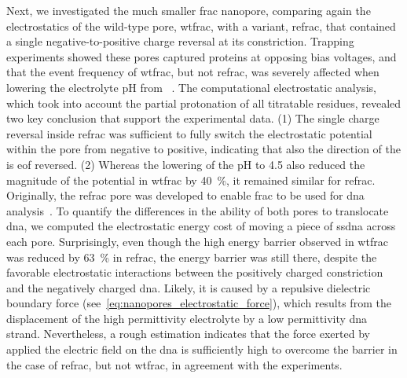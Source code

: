 Next, we investigated the much smaller \gls{frac} nanopore, comparing again the electrostatics of the
wild-type pore, \gls{wtfrac}, with a variant, \gls{refrac}, that contained a single negative-to-positive
charge reversal at its constriction. Trapping experiments showed these pores captured proteins at opposing
bias voltages, and that the event frequency of \gls{wtfrac}, but not \gls{refrac}, was severely affected when
lowering the electrolyte pH from ~\cite{Huang-2017}. The computational electrostatic
analysis, which took into account the partial protonation of all titratable residues, revealed two key
conclusion that support the experimental data. (1) The single charge reversal inside \gls{refrac} was
sufficient to fully switch the electrostatic potential within the pore \lumen{} from negative to positive,
indicating that also the direction of the is \gls{eof} reversed. (2) Whereas the lowering of the pH to 4.5
also reduced the magnitude of the potential in \gls{wtfrac} by \SI{40}{\percent}, it remained similar for
\gls{refrac}. Originally, the \gls{refrac} pore was developed to enable \gls{frac} to be used for \gls{dna}
analysis~\cite{Wloka-2016}. To quantify the differences in the ability of both pores to translocate \gls{dna},
we computed the electrostatic energy cost of moving a piece of \gls{ssdna} across each pore. Surprisingly,
even though the high energy barrier observed in \gls{wtfrac} was reduced by \SI{63}{\percent} in \gls{refrac},
the energy barrier was still there, despite the favorable electrostatic interactions between the positively
charged constriction and the negatively charged \gls{dna}. Likely, it is caused by a repulsive dielectric
boundary force (see~\cref{eq:nanopores_electrostatic_force}), which results from the displacement of the high
permittivity electrolyte by a low permittivity \gls{dna} strand. Nevertheless, a rough estimation indicates
that the force exerted by applied the electric field on the \gls{dna} is sufficiently high to overcome the
barrier in the case of \gls{refrac}, but not \gls{wtfrac}, in agreement with the experiments.


